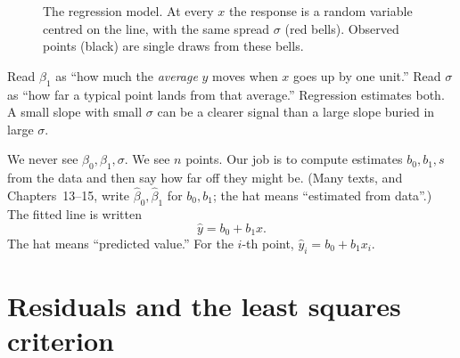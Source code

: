 \begin{figure}[H]
\centering
{}
\caption{The regression model. At every $x$ the response is a random variable
centred on the line, with the same spread $\sigma$ (red bells). Observed points
(black) are single draws from these bells.}
\label{fig:slr-model}
\end{figure}

\begin{intuitionbox}
Read $\beta_1$ as ``how much the \emph{average} $y$ moves when $x$ goes up by
one unit.'' Read $\sigma$ as ``how far a typical point lands from that average.''
Regression estimates both. A small slope with small $\sigma$ can be a clearer
signal than a large slope buried in large $\sigma$.
\end{intuitionbox}

We never see $\beta_0,\beta_1,\sigma$. We see $n$ points. Our job is to compute
estimates $b_0, b_1, s$ from the data and then say how far off they might be.
(Many texts, and Chapters~13--15, write $\hat\beta_0, \hat\beta_1$ for $b_0, b_1$;
the hat means ``estimated from data''.) The fitted line is written
\[
  \hat y = b_0 + b_1 x .
\]
The hat means ``predicted value.'' For the $i$-th point, $\hat y_i = b_0 + b_1 x_i$.

\section{Residuals and the least squares criterion}
\label{sec:slr-ls}

